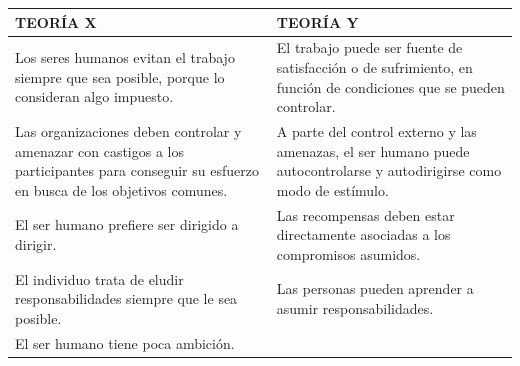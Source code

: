 \documentclass[
]{krantz}
\begin{document}
\begin{longtable}[]{@{}ll@{}}
\toprule
\begin{minipage}[b]{0.47\columnwidth}\raggedright
TEORÍA X\strut
\end{minipage} & \begin{minipage}[b]{0.47\columnwidth}\raggedright
TEORÍA Y\strut
\end{minipage}\tabularnewline
\midrule
\endhead
\begin{minipage}[t]{0.47\columnwidth}\raggedright
Los seres humanos evitan el trabajo siempre que sea posible, porque lo consideran algo impuesto.\strut
\end{minipage} & \begin{minipage}[t]{0.47\columnwidth}\raggedright
El trabajo puede ser fuente de satisfacción o de sufrimiento, en función de condiciones que se pueden controlar.\strut
\end{minipage}\tabularnewline
\begin{minipage}[t]{0.47\columnwidth}\raggedright
Las organizaciones deben controlar y amenazar con castigos a los participantes para conseguir su esfuerzo en busca de los objetivos comunes.\strut
\end{minipage} & \begin{minipage}[t]{0.47\columnwidth}\raggedright
A parte del control externo y las amenazas, el ser humano puede autocontrolarse y autodirigirse como modo de estímulo.\strut
\end{minipage}\tabularnewline
\begin{minipage}[t]{0.47\columnwidth}\raggedright
El ser humano prefiere ser dirigido a dirigir.\strut
\end{minipage} & \begin{minipage}[t]{0.47\columnwidth}\raggedright
Las recompensas deben estar directamente asociadas a los compromisos asumidos.\strut
\end{minipage}\tabularnewline
\begin{minipage}[t]{0.47\columnwidth}\raggedright
El individuo trata de eludir responsabilidades siempre que le sea posible.\strut
\end{minipage} & \begin{minipage}[t]{0.47\columnwidth}\raggedright
Las personas pueden aprender a asumir responsabilidades.\strut
\end{minipage}\tabularnewline
\begin{minipage}[t]{0.47\columnwidth}\raggedright
El ser humano tiene poca ambición.\strut
\end{minipage} & \begin{minipage}[t]{0.47\columnwidth}\raggedright

\end{minipage}
\end{longtable}
\end{document}
